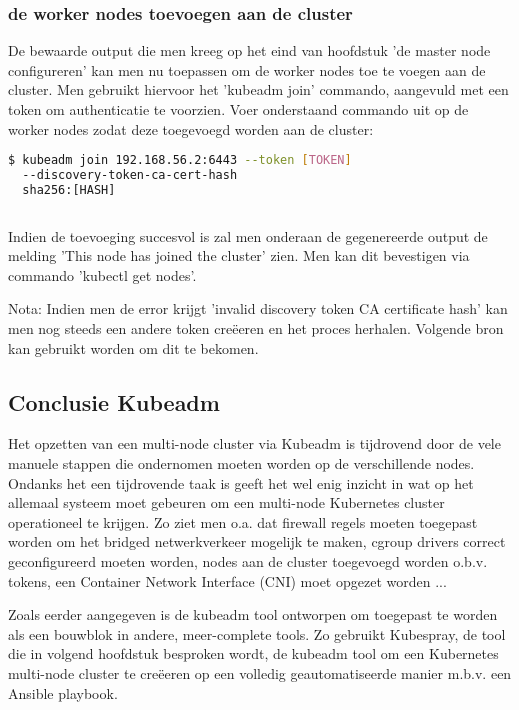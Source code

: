 \subsubsection{de worker nodes toevoegen aan de cluster}

De bewaarde output die men kreeg op het eind van hoofdstuk 'de master node configureren' kan men nu toepassen om de worker nodes toe te voegen aan de cluster. 
Men gebruikt hiervoor het 'kubeadm join' commando, aangevuld met een token om authenticatie te voorzien. Voer onderstaand commando uit op de worker nodes zodat deze toegevoegd worden aan de cluster:
\begin{lstlisting}[language=bash]
$ kubeadm join 192.168.56.2:6443 --token [TOKEN] 
  --discovery-token-ca-cert-hash
  sha256:[HASH]
  
\end{lstlisting} 

Indien de toevoeging succesvol is zal men onderaan de gegenereerde output de melding 'This node has joined the cluster' zien. Men kan dit bevestigen via commando 'kubectl get nodes'. 

Nota: Indien men de error krijgt 'invalid discovery token CA certificate hash' kan men nog steeds een andere token creëeren en het proces herhalen. Volgende bron kan gebruikt worden om dit te bekomen. \autocite{Mukul2020} 

\subsection{Conclusie Kubeadm}

Het opzetten van een multi-node cluster via Kubeadm is tijdrovend door de vele manuele stappen die ondernomen moeten worden op de verschillende nodes. Ondanks het een tijdrovende taak is geeft het wel enig inzicht in wat op het allemaal systeem moet gebeuren om een multi-node Kubernetes cluster operationeel te krijgen. Zo ziet men o.a. dat firewall regels moeten toegepast worden om het bridged netwerkverkeer mogelijk te maken, cgroup drivers correct geconfigureerd moeten worden, nodes aan de cluster toegevoegd worden o.b.v. tokens, een Container Network Interface (CNI) moet opgezet worden ... 

Zoals eerder aangegeven is de kubeadm tool ontworpen om toegepast te worden als een bouwblok in andere, meer-complete tools. Zo gebruikt Kubespray, de tool die in volgend hoofdstuk besproken wordt, de kubeadm tool om een Kubernetes multi-node cluster te creëeren op een volledig geautomatiseerde manier m.b.v. een Ansible playbook.       

